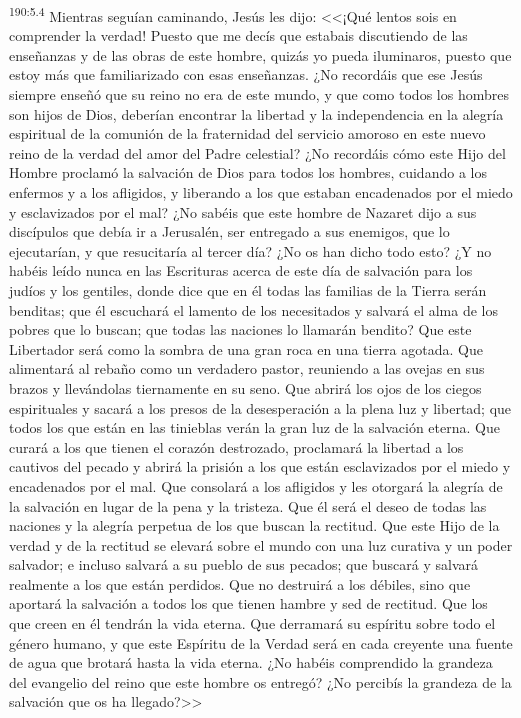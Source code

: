 \par 
\textsuperscript{190:5.4} Mientras seguían caminando, Jesús les dijo: <<¡Qué lentos sois en comprender la verdad! Puesto que me decís que estabais discutiendo de las enseñanzas y de las obras de este hombre, quizás yo pueda iluminaros, puesto que estoy más que familiarizado con esas enseñanzas. ¿No recordáis que ese Jesús siempre enseñó que su reino no era de este mundo, y que como todos los hombres son hijos de Dios, deberían encontrar la libertad y la independencia en la alegría espiritual de la comunión de la fraternidad del servicio amoroso en este nuevo reino de la verdad del amor del Padre celestial? ¿No recordáis cómo este Hijo del Hombre proclamó la salvación de Dios para todos los hombres, cuidando a los enfermos y a los afligidos, y liberando a los que estaban encadenados por el miedo y esclavizados por el mal? ¿No sabéis que este hombre de Nazaret dijo a sus discípulos que debía ir a Jerusalén, ser entregado a sus enemigos, que lo ejecutarían, y que resucitaría al tercer día? ¿No os han dicho todo esto? ¿Y no habéis leído nunca en las Escrituras acerca de este día de salvación para los judíos y los gentiles, donde dice que en él todas las familias de la Tierra serán benditas; que él escuchará el lamento de los necesitados y salvará el alma de los pobres que lo buscan; que todas las naciones lo llamarán bendito? Que este Libertador será como la sombra de una gran roca en una tierra agotada. Que alimentará al rebaño como un verdadero pastor, reuniendo a las ovejas en sus brazos y llevándolas tiernamente en su seno. Que abrirá los ojos de los ciegos espirituales y sacará a los presos de la desesperación a la plena luz y libertad; que todos los que están en las tinieblas verán la gran luz de la salvación eterna. Que curará a los que tienen el corazón destrozado, proclamará la libertad a los cautivos del pecado y abrirá la prisión a los que están esclavizados por el miedo y encadenados por el mal. Que consolará a los afligidos y les otorgará la alegría de la salvación en lugar de la pena y la tristeza. Que él será el deseo de todas las naciones y la alegría perpetua de los que buscan la rectitud. Que este Hijo de la verdad y de la rectitud se elevará sobre el mundo con una luz curativa y un poder salvador; e incluso salvará a su pueblo de sus pecados; que buscará y salvará realmente a los que están perdidos. Que no destruirá a los débiles, sino que aportará la salvación a todos los que tienen hambre y sed de rectitud. Que los que creen en él tendrán la vida eterna. Que derramará su espíritu sobre todo el género humano, y que este Espíritu de la Verdad será en cada creyente una fuente de agua que brotará hasta la vida eterna. ¿No habéis comprendido la grandeza del evangelio del reino que este hombre os entregó? ¿No percibís la grandeza de la salvación que os ha llegado?>>

